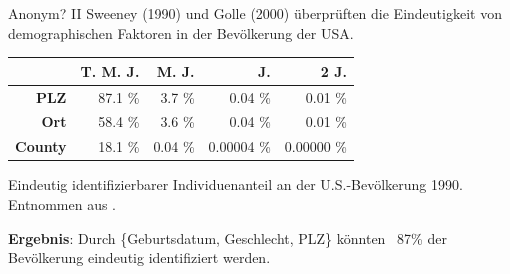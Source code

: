 \begin{frame}{Anonym? II}
	Sweeney \cite{sweeney_demographics}(1990) und Golle \cite{golle_demographics}(2000) überprüften die Eindeutigkeit von demographischen Faktoren in der Bevölkerung der USA.
	
	
	\begin{center}
		\begin{tabular}{|r|r|r|r|r|}
		\hline	 & \textbf{T. M. J.} & \textbf{M. J.} & \textbf{J.} & \textbf{2 J.} \\
		\hline \textbf{PLZ} & 87.1 \% & 3.7 \% & 0.04 \% & 0.01 \% \\
		\hline \textbf{Ort} & 58.4 \% & 3.6 \% & 0.04 \% & 0.01 \% \\
		\hline \textbf{County} & 18.1 \% & 0.04 \% & 0.00004 \% & 0.00000 \% \\
		\hline
		\end{tabular}
		\vspace{0.2cm}
	
		\tiny Eindeutig identifizierbarer Individuenanteil an der U.S.-Bevölkerung 1990. Entnommen aus \cite{sweeney_demographics}.
	\end{center}

	\textbf{Ergebnis}: Durch \{Geburtsdatum, Geschlecht, PLZ\} könnten ~87\% der Bevölkerung eindeutig identifiziert werden.
		
\end{frame}

